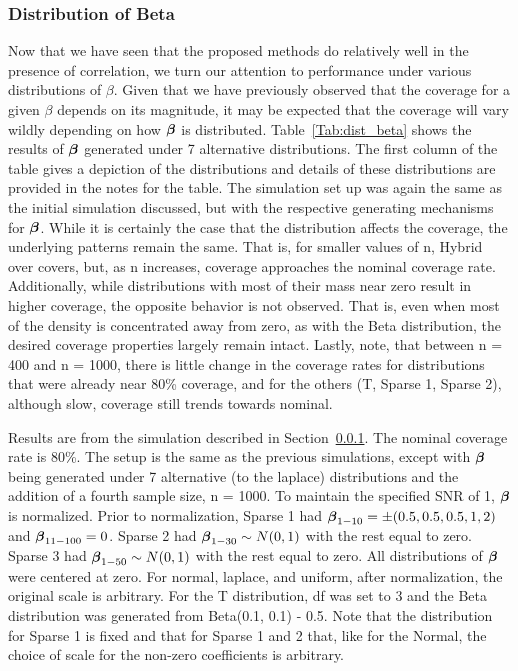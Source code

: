 \subsubsection{Distribution of Beta}\label{Sec:Distribution}

Now that we have seen that the proposed methods do relatively well in the presence of correlation, we turn our attention to performance under various distributions of $\beta$. Given that we have previously observed that the coverage for a given $\beta$ depends on its magnitude, it may be expected that the coverage will vary wildly depending on how $\boldsymbol{\beta}$ is distributed. Table~\ref{Tab:dist_beta} shows the results of $\boldsymbol{\beta}$ generated under 7 alternative distributions. The first column of the table gives a depiction of the distributions and details of these distributions are provided in the notes for the table. The simulation set up was again the same as the initial simulation discussed, but with the respective generating mechanisms for $\boldsymbol{\beta}$. While it is certainly the case that the distribution affects the coverage, the underlying patterns remain the same. That is, for smaller values of n, Hybrid over covers, but, as n increases, coverage approaches the nominal coverage rate. Additionally, while distributions with most of their mass near zero result in higher coverage, the opposite behavior is not observed. That is, even when most of the density is concentrated away from zero, as with the Beta distribution, the desired coverage properties largely remain intact. Lastly, note, that between n = 400 and n = 1000, there is little change in the coverage rates for distributions that were already near 80\% coverage, and for the others (T, Sparse 1, Sparse 2), although slow, coverage still trends towards nominal.

\begin{table}[hbtp]
  \centering
  
  \caption{\label{Tab:dist_beta} Results are from the simulation described in Section~\ref{Sec:Distribution}. The nominal coverage rate is 80\%. The setup is the same as the previous simulations, except with $\boldsymbol{\beta}$ being generated under 7 alternative (to the laplace) distributions and the addition of a fourth sample size, n = 1000. To maintain the specified SNR of 1, $\boldsymbol{\beta}$ is normalized. Prior to normalization, Sparse 1 had $\boldsymbol{\beta}_{1-10} = \pm(0.5, 0.5, 0.5, 1, 2)$ and $\boldsymbol{\beta}_{11-100} = 0$. Sparse 2 had $\boldsymbol{\beta}_{1-30} \sim N(0, 1)$ with the rest equal to zero.  Sparse 3 had $\boldsymbol{\beta}_{1-50} \sim N(0, 1)$ with the rest equal to zero. All distributions of $\boldsymbol{\beta}$ were centered at zero. For normal, laplace, and uniform, after normalization, the original scale is arbitrary. For the T distribution, df was set to 3 and the Beta distribution was generated from Beta(0.1, 0.1) - 0.5. Note that the distribution for Sparse 1 is fixed and that for Sparse 1 and 2 that, like for the Normal, the choice of scale for the non-zero coefficients is arbitrary.}
\end{table}

